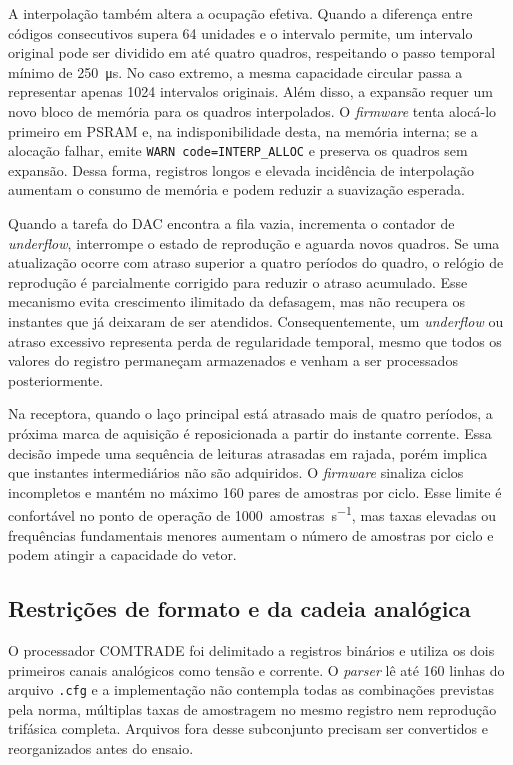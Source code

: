 A interpolação também altera a ocupação efetiva. Quando a diferença entre códigos consecutivos supera 64 unidades e o intervalo permite, um intervalo original pode ser dividido em até quatro quadros, respeitando o passo temporal mínimo de \SI{250}{\micro\second}. No caso extremo, a mesma capacidade circular passa a representar apenas 1024 intervalos originais. Além disso, a expansão requer um novo bloco de memória para os quadros interpolados. O \textit{firmware} tenta alocá-lo primeiro em PSRAM e, na indisponibilidade desta, na memória interna; se a alocação falhar, emite \texttt{WARN code=INTERP\_ALLOC} e preserva os quadros sem expansão. Dessa forma, registros longos e elevada incidência de interpolação aumentam o consumo de memória e podem reduzir a suavização esperada.

Quando a tarefa do DAC encontra a fila vazia, incrementa o contador de \textit{underflow}, interrompe o estado de reprodução e aguarda novos quadros. Se uma atualização ocorre com atraso superior a quatro períodos do quadro, o relógio de reprodução é parcialmente corrigido para reduzir o atraso acumulado. Esse mecanismo evita crescimento ilimitado da defasagem, mas não recupera os instantes que já deixaram de ser atendidos. Consequentemente, um \textit{underflow} ou atraso excessivo representa perda de regularidade temporal, mesmo que todos os valores do registro permaneçam armazenados e venham a ser processados posteriormente.

Na receptora, quando o laço principal está atrasado mais de quatro períodos, a próxima marca de aquisição é reposicionada a partir do instante corrente. Essa decisão impede uma sequência de leituras atrasadas em rajada, porém implica que instantes intermediários não são adquiridos. O \textit{firmware} sinaliza ciclos incompletos e mantém no máximo 160 pares de amostras por ciclo. Esse limite é confortável no ponto de operação de \SI{1000}{amostras\per\second}, mas taxas elevadas ou frequências fundamentais menores aumentam o número de amostras por ciclo e podem atingir a capacidade do vetor.

\subsection{Restrições de formato e da cadeia analógica}

O processador COMTRADE foi delimitado a registros binários e utiliza os dois primeiros canais analógicos como tensão e corrente. O \textit{parser} lê até 160 linhas do arquivo \texttt{.cfg} e a implementação não contempla todas as combinações previstas pela norma, múltiplas taxas de amostragem no mesmo registro nem reprodução trifásica completa. Arquivos fora desse subconjunto precisam ser convertidos e reorganizados antes do ensaio.

